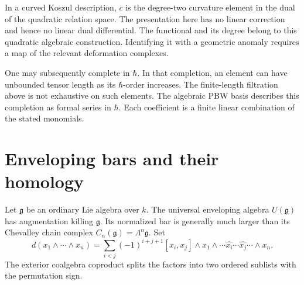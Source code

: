 In a curved Koszul description, $c$ is the degree-two curvature element in the dual of the quadratic relation space. The presentation here has no linear correction and hence no linear dual differential.
The functional and its degree belong to this quadratic algebraic construction.
Identifying it with a geometric anomaly requires a map of the relevant deformation complexes.

One may subsequently complete in $\hbar$.
In that completion, an element can have unbounded tensor length as its $\hbar$-order increases.
The finite-length filtration above is not exhaustive on such elements.
The algebraic PBW basis describes this completion as formal series in $\hbar$.
Each coefficient is a finite linear combination of the stated monomials.

\section{Enveloping bars and their homology}

Let $\mathfrak g$ be an ordinary Lie algebra over $k$.
The universal enveloping algebra $U(\mathfrak g)$ has augmentation killing $\mathfrak g$.
Its normalized bar is generally much larger than its Chevalley chain complex
$C_n(\mathfrak g)=\Lambda^n\mathfrak g$.
Set
\[
 d(x_1\wedge\cdots\wedge x_n)
 =\sum_{i<j}(-1)^{i+j+1}[x_i,x_j]\wedge
 x_1\wedge\cdots\widehat{x_i}\cdots\widehat{x_j}\cdots\wedge x_n.
\]
The exterior coalgebra coproduct splits the factors into two ordered sublists with the permutation sign.


